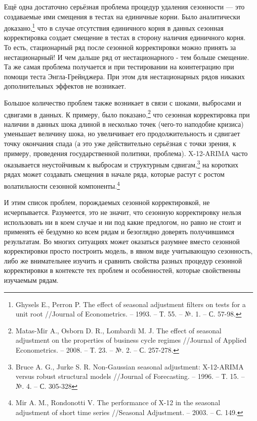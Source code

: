 \documentclass[final,pdftex]{../../template/epsilonj}\usepackage[]{graphicx}\usepackage[]{color}
\begin{document}
Ещё одна достаточно серьёзная проблема процедур удаления сезонности --- это создаваемые ими смещения в тестах на единичные корни. Было аналитически доказано,\footnote{Ghysels E., Perron P. The effect of seasonal adjustment filters on tests for a unit root //Journal of Econometrics. – 1993. – Т. 55. – №. 1. – С. 57-98.} что в случае отсутствия единичного корня в данных сезонная корректировка создает смещение в тестах в сторону наличия единичного корня. То есть, стационарный ряд после сезонной корректировки можно принять за нестационарный! И чем дальше ряд от нестационарного - тем больше смещение. Та же самая проблема получается и при тестировании на коинтеграцию при помощи теста Энгла-Грейнджера. При этом для нестационарных рядов никаких дополнительных эффектов не возникает. 

Большое количество проблем также возникает в связи с шоками, выбросами и сдвигами в данных. К примеру, было показано,\footnote{Matas-Mir A., Osborn D. R., Lombardi M. J. The effect of seasonal adjustment on the properties of business cycle regimes //Journal of Applied Econometrics. – 2008. – Т. 23. – №. 2. – С. 257-278.} что сезонная корректировка при наличии в данных шока длиной в несколько точек (чего-то наподобие кризиса) уменьшает величину шока, но увеличивает его продолжительность и сдвигает точку окончания спада (а это уже действительно серьёзная с точки зрения, к примеру, проведения государственной политики, проблема). X-12-ARIMA часто оказывается неустойчивым к выбросам и структурным сдвигам,\footnote{Bruce A. G., Jurke S. R. Non-Gaussian seasonal adjustment: X-12-ARIMA versus robust structural models //Journal of Forecasting. – 1996. – Т. 15. – №. 4. – С. 305-328} на коротких рядах может создавать смещения в начале ряда, которые растут с ростом волатильности сезонной компоненты.\footnote{Mir A. M., Rondonotti V. The performance of X-12 in the seasonal adjustment of short time series //Seasonal Adjustment. – 2003. – С. 149.}

И этим список проблем, порождаемых сезонной корректировкой, не исчерпывается. Разумеется, это не значит, что сезонную корректировку нельзя использовать ни в коем случае и ни под какие предлогом, но равно не стоит и применять её бездумно ко всем рядам и безоглядно доверять получившимся результатам. Во многих ситуациях может оказаться разумнее вместо сезонной корректировки просто построить модель, в явном виде учитывающую сезонность, либо же внимательнее изучить и сравнить свойства разных процедур сезонной корректировки в контексте тех проблем и особенностей, которые свойственны изучаемым рядам. 
\end{document}
